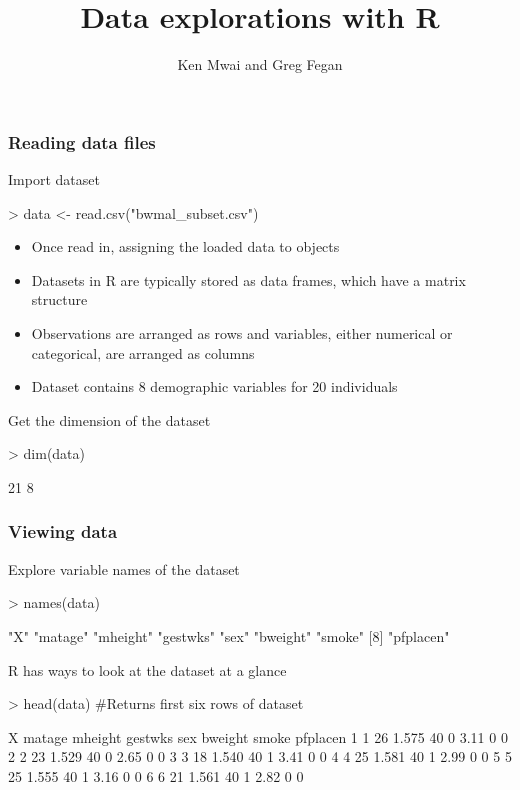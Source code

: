 \documentclass{beamer}
\title{Data explorations with R}
\author{Ken Mwai and Greg Fegan}
\begin{document}

\begin{frame}
\titlepage
\end{frame}

\begin{frame}[fragile]\frametitle{Reading data files}
Import dataset
\begin{Schunk}
\begin{Sinput}
> data <- read.csv("bwmal_subset.csv")
\end{Sinput}
\end{Schunk}
\pause
\begin{itemize}
  \item Once read in, assigning the loaded data to objects
  \item Datasets in R are typically stored as data frames, which have a matrix structure 
  \item Observations are arranged as rows and variables, either numerical or categorical, are arranged as columns
  \item Dataset contains 8 demographic variables for 20 individuals
\end{itemize}
\pause
Get the dimension of the dataset
\begin{Schunk}
\begin{Sinput}
> dim(data)
\end{Sinput}
\begin{Soutput}
[1] 21  8
\end{Soutput}
\end{Schunk}
\end{frame}

\begin{frame}[fragile]\frametitle{Viewing data}
\small
Explore variable names of the dataset
\begin{Schunk}
\begin{Sinput}
> names(data) 
\end{Sinput}
\begin{Soutput}
[1] "X"        "matage"   "mheight"  "gestwks"  "sex"      "bweight"  "smoke"   
[8] "pfplacen"
\end{Soutput}
\end{Schunk}
R has ways to look at the dataset at a glance
\begin{Schunk}
\begin{Sinput}
> head(data) #Returns first six rows of dataset
\end{Sinput}
\begin{Soutput}
  X matage mheight gestwks sex bweight smoke pfplacen
1 1     26   1.575      40   0    3.11     0        0
2 2     23   1.529      40   0    2.65     0        0
3 3     18   1.540      40   1    3.41     0        0
4 4     25   1.581      40   1    2.99     0        0
5 5     25   1.555      40   1    3.16     0        0
6 6     21   1.561      40   1    2.82     0        0
\end{Soutput}
\end{Schunk}
\end{frame}
\end{document}
